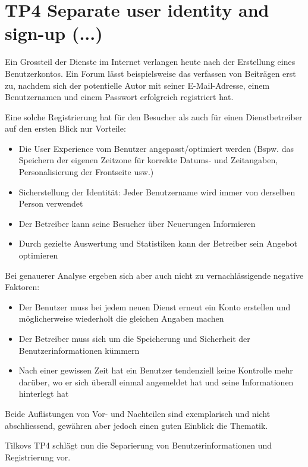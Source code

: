\section{TP4 Separate user identity and sign-up (...)}
\label{sec:principle-tp4-seperate-user-identity}

Ein Grossteil der Dienste im Internet verlangen heute nach der Erstellung eines Benutzerkontos. Ein Forum lässt beispielsweise das verfassen von Beiträgen erst zu, nachdem sich der potentielle Autor mit seiner E-Mail-Adresse, einem Benutzernamen und einem Passwort erfolgreich registriert hat.

Eine solche Registrierung hat für den Besucher als auch für einen Dienstbetreiber auf den ersten Blick nur Vorteile:

\begin{itemize}
	\item Die User Experience vom Benutzer angepasst/optimiert werden (Bspw. das Speichern der eigenen Zeitzone für korrekte Datums- und Zeitangaben, Personalisierung der Frontseite usw.)
	\item Sicherstellung der Identität: Jeder Benutzername wird immer von derselben Person verwendet
	\item Der Betreiber kann seine Besucher über Neuerungen Informieren
	\item Durch gezielte Auswertung und Statistiken kann der Betreiber sein Angebot optimieren
\end{itemize}

Bei genauerer Analyse ergeben sich aber auch nicht zu vernachlässigende negative Faktoren:

\begin{itemize}
	\item Der Benutzer muss bei jedem neuen Dienst erneut ein Konto erstellen und möglicherweise wiederholt die gleichen Angaben machen
	\item Der Betreiber muss sich um die Speicherung und Sicherheit der Benutzerinformationen kümmern
	\item Nach einer gewissen Zeit hat ein Benutzer tendenziell keine Kontrolle mehr darüber, wo er sich überall einmal angemeldet hat und seine Informationen hinterlegt hat
\end{itemize}

Beide Auflistungen von Vor- und Nachteilen sind exemplarisch und nicht abschliessend, gewähren aber jedoch einen guten Einblick die Thematik.

Tilkovs TP4 schlägt nun die Separierung von Benutzerinformationen und Registrierung vor.

